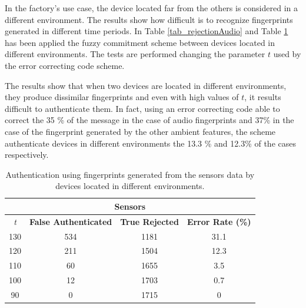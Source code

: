 In the factory's use case, the device  located far from the others is considered in a different environment.
The results show how difficult is to recognize fingerprints generated in different time periods. 
In Table \ref{tab_rejectionAudio} and Table \ref{tab_rejectionSensor} has been applied the fuzzy commitment scheme between devices located in different environments.
The tests are performed changing the parameter $t$ used by the error correcting code scheme.

The results show that when two devices are located in different environments, they produce dissimilar fingerprints and even with high values of $t$, it results difficult to authenticate them.
In fact, using an error correcting code able to correct the 35 \% of the message in the case of audio fingerprints and 37\% in the case of the fingerprint generated by the other ambient features, the scheme authenticate devices in different environments the 13.3 \% and 12.3\% of the cases respectively.

\begin{table}[H]
\label{tab_rejectionSensor}
\begin{center}
\begin{tabular}{|c|c c c|}
\hline
\multicolumn{4}{|c|}{\textbf{Sensors}} \\\hline
\textit{t} &\textbf{False Authenticated}& \textbf{True Rejected}& \textbf{Error Rate (\%)}  \\ \cline{1-4}
130 & 534 & 1181 & 31.1\\ \cline{2-4}
120 & 211 & 1504 & 12.3\\ \cline{2-4}
110 & 60 & 1655 & 3.5\\ \cline{2-4}
100 & 12 & 1703 & 0.7\\ \cline{2-4}
90 & 0 & 1715 & 0 \\ \cline{1-4}
\end{tabular}
\caption{Authentication using fingerprints generated from the sensors data by devices located in different environments. }
\end{center}
\end{table}

